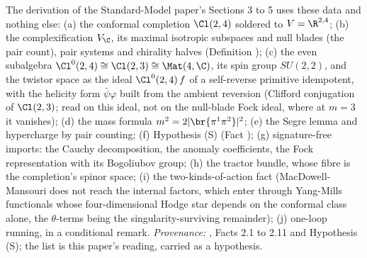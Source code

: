 The derivation of the Standard-Model paper's Sections 3 to 5 uses these data and nothing else: (a) the conformal completion $\Cl(2,4)$ soldered to $V = \R^{2,4}$; (b) the complexification $V_{\C}$, its maximal isotropic subspaces and null blades (the pair count), pair systems and chirality halves (Definition ); (c) the even subalgebra $\Cl^{0}(2,4) \cong \Cl(2,3) \cong \Mat(4,\C)$, its spin group $SU(2,2)$, and the twistor space as the ideal $\Cl^{0}(2,4)\,f$ of a self-reverse primitive idempotent, with the helicity form $\bar{\psi}\varphi$ built from the ambient reversion (Clifford conjugation of $\Cl(2,3)$; read on this ideal, not on the null-blade Fock ideal, where at $m = 3$ it vanishes); (d) the mass formula $m^{2} = 2|\br{\pi^{1}\pi^{2}}|^{2}$; (e) the Segre lemma and hypercharge by pair counting; (f) Hypothesis (S) (Fact ); (g) signature-free imports: the Cauchy decomposition, the anomaly coefficients, the Fock representation with its Bogoliubov group; (h) the tractor bundle, whose fibre is the completion's spinor space; (i) the two-kinds-of-action fact (MacDowell-Mansouri does not reach the internal factors, which enter through Yang-Mills functionals whose four-dimensional Hodge star depends on the conformal class alone, the $\theta$-terms being the singularity-surviving remainder); (j) one-loop running, in a conditional remark. \emph{Provenance:} \cite[\S\S2-5]{ButlerT12}, Facts 2.1 to 2.11 and Hypothesis (S); the list is this paper's reading, carried as a hypothesis.
